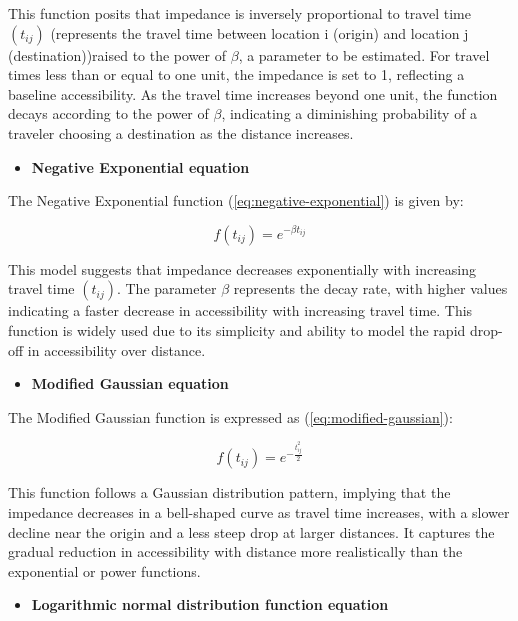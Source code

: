 \documentclass[
11pt, %
oneside, %
english, %
singlespacing, %
]{macthesis} %
\def\tightlist{}
\begin{document}
This function posits that impedance is inversely proportional to travel time \((t_{ij})\) (represents the travel time between location i (origin) and location j (destination))raised to the power of \(\beta\), a parameter to be estimated. For travel times less than or equal to one unit, the impedance is set to 1, reflecting a baseline accessibility. As the travel time increases beyond one unit, the function decays according to the power of \(\beta\), indicating a diminishing probability of a traveler choosing a destination as the distance increases.

\begin{itemize}
\tightlist
\item
  \textbf{Negative Exponential equation}
\end{itemize}

The Negative Exponential function (\ref{eq:negative-exponential}) is given by:

\begin{equation}
f(t_{ij}) = e^{-\beta t_{ij}}
\label{eq:negative-exponential}
\end{equation}

This model suggests that impedance decreases exponentially with increasing travel time \((t_{ij})\). The parameter \(\beta\) represents the decay rate, with higher values indicating a faster decrease in accessibility with increasing travel time. This function is widely used due to its simplicity and ability to model the rapid drop-off in accessibility over distance.

\begin{itemize}
\tightlist
\item
  \textbf{Modified Gaussian equation}
\end{itemize}

The Modified Gaussian function is expressed as (\ref{eq:modified-gaussian}):

\begin{equation}
f(t_{ij}) = e^{-\frac{t_{ij}^2}{2}}
\label{eq:modified-gaussian}
\end{equation}

This function follows a Gaussian distribution pattern, implying that the impedance decreases in a bell-shaped curve as travel time increases, with a slower decline near the origin and a less steep drop at larger distances. It captures the gradual reduction in accessibility with distance more realistically than the exponential or power functions.

\begin{itemize}
\tightlist
\item
  \textbf{Logarithmic normal distribution function equation}
\end{itemize}
\end{document}
